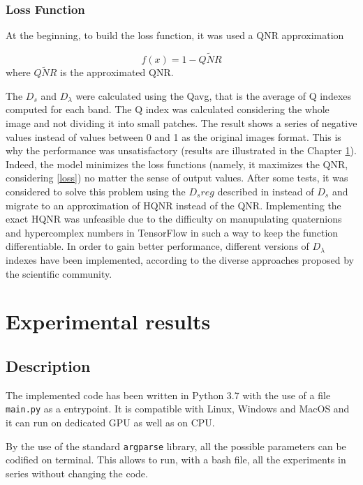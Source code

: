 \documentclass[12pt]{report}
\begin{document}
\subsection{Loss Function}

At the beginning, to build the loss function, it was used a QNR approximation 

\begin{equation}
    f(x) = 1 - \widetilde{QNR}
    \label{loss}
\end{equation}
%
where $\widetilde{QNR}$ is the approximated QNR.

The $D_s$ and $D_\lambda$ were calculated using the Qavg, that is the average of Q indexes computed for each band. The Q index was calculated considering the whole image and not
dividing it into small patches.
The result shows a series of negative values instead of values between 0 and 1 as the original images format.
This is why the performance was unsatisfactory (results are illustrated in the Chapter \ref{chap4}).
Indeed, the model minimizes the loss functions (namely, it maximizes the QNR, considering \ref{loss}) no matter 
the sense of output values.
After some tests, it was considered to solve this problem using the $D_sreg$ described in \cite{dsreg} instead of $D_s$  
and migrate to an approximation of HQNR instead of the QNR.
Implementing the exact HQNR was unfeasible due to the difficulty on manupulating quaternions and hypercomplex numbers in TensorFlow in such
a way to keep the function differentiable.
In order to gain better performance, different versions of $D_\lambda$ indexes have been implemented, according to the diverse approaches proposed by the scientific community.

\chapter{Experimental results}\label{chap4}
\section{Description}
\label{description}
The implemented code has been written in Python 3.7 with the use of a file \texttt{main.py} as a entrypoint. 
It is compatible with Linux, Windows and MacOS and it can run on dedicated GPU as well as on CPU.

By the use of the standard \texttt{argparse} library, all the possible parameters can be codified on terminal.
This allows to run, with a bash file, all the experiments in series without changing the code.
\end{document}
